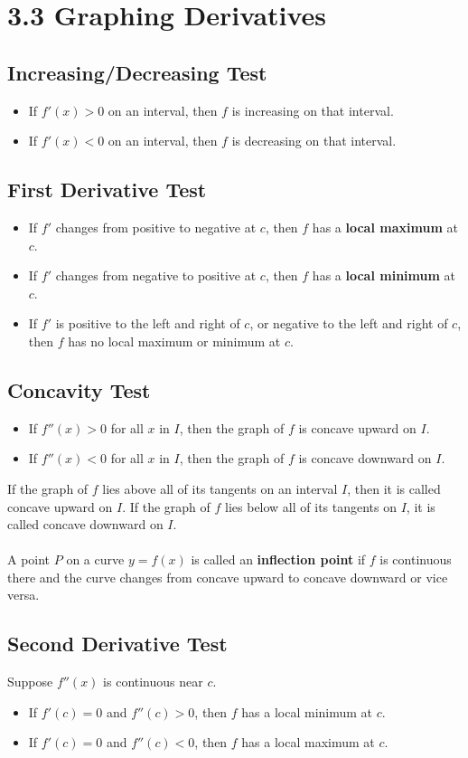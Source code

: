 %
%

\section*{3.3 Graphing Derivatives}

\subsection*{Increasing/Decreasing Test}

\begin{itemize}
    \item If \(f'(x)>0\) on an interval, then \(f\) is increasing on that interval.
    \item If \(f'(x)<0\) on an interval, then \(f\) is decreasing on that interval.
\end{itemize}

\subsection*{First Derivative Test}

\begin{itemize}
    \item If \(f'\) changes from positive to negative at \(c\), then \(f\) has a \textbf{local maximum} at \(c\).
    \item If \(f'\) changes from negative to positive at \(c\), then \(f\) has a \textbf{local minimum} at \(c\).
    \item If \(f'\) is positive to the left and right of \(c\), or negative to the left and right of \(c\), then \(f\) has no local maximum or minimum at \(c\).
\end{itemize}

\subsection*{Concavity Test}

\begin{itemize}
    \item If \(f''(x) > 0\) for all \(x\) in \(I\), then the graph of \(f\) is concave upward on
\(I\).
    \item If \(f''(x) < 0\) for all \(x\) in \(I\), then the graph of \(f\) is concave downward on \(I\).
\end{itemize}
If the graph of \(f\) lies above all of its tangents on an interval \(I\), then it is called concave upward on \(I\). If the graph of \(f\) lies below all of its tangents on \(I\), it is called concave downward on \(I\).
\\\\
A point \(P\) on a curve \(y=f(x)\) is called an \textbf{inflection point} if \(f\) is continuous there and the curve changes from concave upward to concave downward or vice versa.

\subsection*{Second Derivative Test}

Suppose \(f''(x)\) is continuous near \(c\).
\begin{itemize}
    \item If \(f'(c) = 0\) and \(f''(c) > 0\), then \(f\) has a local minimum at \(c\).
    \item If \(f'(c) = 0\) and \(f''(c) < 0\), then \(f\) has a local maximum at \(c\).
\end{itemize}
